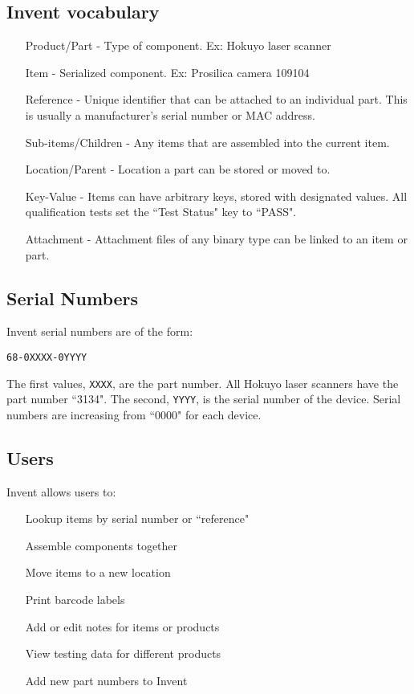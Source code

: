 \documentclass[11pt]{book}
\begin{document}
\subsection{Invent vocabulary}
\begin{itemize}
\item[Product/Part] - Type of component. Ex: Hokuyo laser scanner
\item[Item] - Serialized component. Ex: Prosilica camera 109104
\item[Reference] - Unique identifier that can be attached to an individual part. This is usually a manufacturer's serial number or MAC address.
\item[Sub-items/Children] - Any items that are assembled into the current item.
\item[Location/Parent] - Location a part can be stored or moved to.
\item[Key-Value] - Items can have arbitrary keys, stored with designated values. All qualification tests set the ``Test Status" key to ``PASS".
\item[Attachment] - Attachment files of any binary type can be linked to an item or part.
\end{itemize}

\subsection{Serial Numbers}
Invent serial numbers are of the form:
\begin{verbatim}
68-0XXXX-0YYYY
\end{verbatim}
The first values, \texttt{XXXX}, are the part number. All Hokuyo laser scanners have the part number ``3134". The second, \texttt{YYYY}, is the serial number of the device. Serial numbers are increasing from ``0000" for each device.

\subsection{Users}
Invent allows users to:
\begin{itemize}
\item[Lookup] items by serial number or ``reference"
\item[Assemble] components together
\item[Move] items to a new location
\item[Print] barcode labels 
\item[Add] or edit notes for items or products
\item[View] testing data for different products
\item[Add] new part numbers to Invent
\end{itemize}
\end{document}
